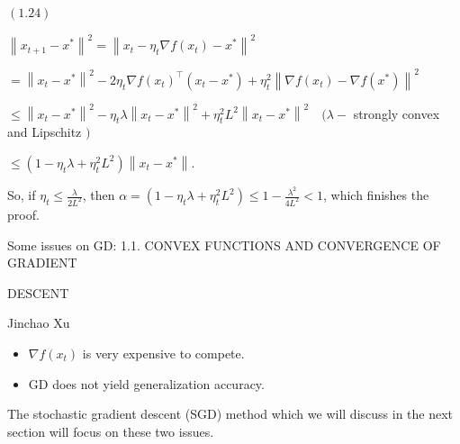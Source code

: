 \documentclass[10pt]{article}
\begin{document}
$(1.24)$

$\left\|x_{t+1}-x^{*}\right\|^{2}=\left\|x_{t}-\eta_{t} \nabla f\left(x_{t}\right)-x^{*}\right\|^{2}$

$=\left\|x_{t}-x^{*}\right\|^{2}-2 \eta_{t} \nabla f\left(x_{t}\right)^{\top}\left(x_{t}-x^{*}\right)+\eta_{t}^{2}\left\|\nabla f\left(x_{t}\right)-\nabla f\left(x^{*}\right)\right\|^{2}$

$\leq\left\|x_{t}-x^{*}\right\|^{2}-\eta_{t} \lambda\left\|x_{t}-x^{*}\right\|^{2}+\eta_{t}^{2} L^{2}\left\|x_{t}-x^{*}\right\|^{2} \quad(\lambda-$ strongly convex and Lipschitz $)$

$\leq\left(1-\eta_{t} \lambda+\eta_{t}^{2} L^{2}\right)\left\|x_{t}-x^{*}\right\|$.

So, if $\eta_{t} \leq \frac{\lambda}{2 L^{2}}$, then $\alpha=\left(1-\eta_{t} \lambda+\eta_{t}^{2} L^{2}\right) \leq 1-\frac{\lambda^{2}}{4 L^{2}}<1$, which finishes the proof.

Some issues on GD: 1.1. CONVEX FUNCTIONS AND CONVERGENCE OF GRADIENT

DESCENT

Jinchao Xu

\begin{itemize}
  \item $\nabla f\left(x_{t}\right)$ is very expensive to compete.

  \item GD does not yield generalization accuracy.

\end{itemize}
The stochastic gradient descent (SGD) method which we will discuss in the next section will focus on these two issues.
\end{document}
